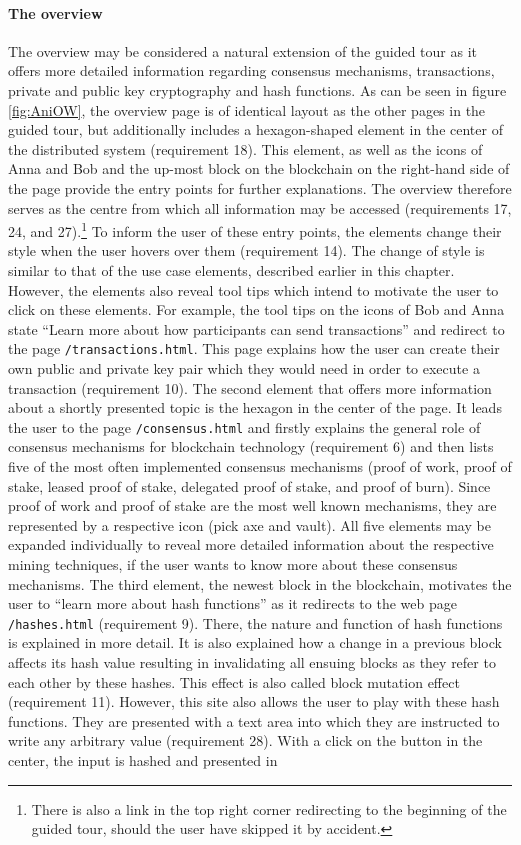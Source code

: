 \paragraph{The overview}
The overview may be considered a natural extension of the guided tour as it offers more detailed information regarding consensus mechanisms, transactions, private and public key cryptography and hash functions. As can be seen in figure \ref{fig:AniOW}, the overview page is of identical layout as the other pages in the guided tour, but additionally includes a hexagon-shaped element in the center of the distributed system (requirement 18). This element, as well as the icons of Anna and Bob and the up-most block on the blockchain on the right-hand side of the page provide the entry points for further explanations. The overview therefore serves as the centre from which all information may be accessed (requirements 17, 24, and 27).\footnote{There is also a link in the top right corner redirecting to the beginning of the guided tour, should the user have skipped it by accident.} To inform the user of these entry points, the elements change their style when the user hovers over them (requirement 14). The change of style is similar to that of the use case elements, described earlier in this chapter. However, the elements also reveal tool tips which intend to motivate the user to click on these elements. For example, the tool tips on the icons of Bob and Anna state \enquote{Learn more about how participants can send transactions} and redirect to the page \texttt{/transactions.html}. This page explains how the user can create their own public and private key pair which they would need in order to execute a transaction (requirement 10). The second element that offers more information about a shortly presented topic is the hexagon in the center of the page. It leads the user to the page \texttt{/consensus.html} and firstly explains the general role of consensus mechanisms for blockchain technology (requirement 6) and then lists five of the most often implemented consensus mechanisms (proof of work, proof of stake, leased proof of stake, delegated proof of stake, and proof of burn). Since proof of work and proof of stake are the most well known mechanisms, they are represented by a respective icon (pick axe and vault). All five elements may be expanded individually to reveal more detailed information about the respective mining techniques, if the user wants to know more about these consensus mechanisms. The third element, the newest block in the blockchain, motivates the user to \enquote{learn more about hash functions} as it redirects to the web page \texttt{/hashes.html} (requirement 9). There, the nature and function of hash functions is explained in more detail. It is also explained how a change in a previous block affects its hash value resulting in invalidating all ensuing blocks as they refer to each other by these hashes. This effect is also called block mutation effect (requirement 11). However, this site also allows the user to play with these hash functions. They are presented with a text area into which they are instructed to write any arbitrary value (requirement 28). With a click on the button in the center, the input is hashed and presented in 